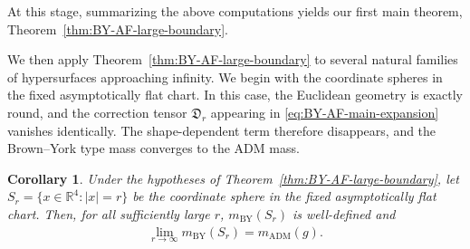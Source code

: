 \documentclass[10pt,a4paper]{amsart}
\newcommand{\ADM}{\mathrm{ADM}}
\newcommand{\BY}{\mathrm{BY}}
\newtheorem{corollary}[theorem]{Corollary}
\begin{document}
	At this stage, summarizing the above computations yields our first main theorem, Theorem~\ref{thm:BY-AF-large-boundary}.
	
	\medskip
	
	We then apply Theorem~\ref{thm:BY-AF-large-boundary} to several natural
	families of hypersurfaces approaching infinity. We begin with the
	coordinate spheres in the fixed asymptotically flat chart. In this
	case, the Euclidean geometry is exactly round, and the correction tensor
	$\mathfrak D_r$ appearing in \eqref{eq:BY-AF-main-expansion} vanishes
	identically. The shape-dependent term therefore disappears, and the
	Brown--York type mass converges to the ADM mass.
	
	\begin{corollary}\label{cor:BY-AF-coordinate-spheres}
		Under the hypotheses of Theorem~\ref{thm:BY-AF-large-boundary}, let
		$S_r=\{x\in\mathbb R^4:|x|=r\}$ be the coordinate sphere in the fixed
		asymptotically flat chart. Then, for all sufficiently large $r$,
		$m_{\BY}(S_r)$ is well-defined and
		\begin{align}
			\lim_{r\to\infty}m_{\BY}(S_r)
			=
			m_{\ADM}(g).
		\end{align}
	\end{corollary}
	
\end{document}
